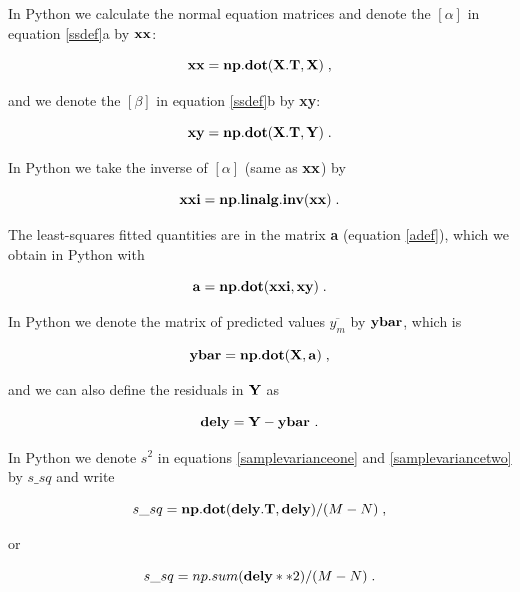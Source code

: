 \documentclass[psfig,preprint]{aastex}
\begin{document}
	In Python we calculate the normal equation matrices and denote the
$[\alpha]$ in equation \ref{ssdef}a by ${\bf xx}$:

\begin{mathletters} \label{eqn24}
\begin{equation}
{\bf xx} = {\bf np.dot(X.T,X)} \; ,
\end{equation}

\noindent and we denote the $[\beta]$ in equation \ref{ssdef}b by {\bf
xy}:

\begin{equation}
{\bf xy} = {\bf np.dot(X.T, Y)} \; .
\end{equation}
\end{mathletters}

\noindent In Python we take the inverse of $[\alpha]$ (same as $\bf xx$) by

\begin{equation}
{\bf xxi} = {\bf np.linalg.inv(xx)} \; .
\end{equation}

	The least-squares fitted quantities are in the matrix {\bf a}
(equation \ref{adef}), which we obtain in Python with

\begin{equation}
{\bf a} = {\bf np.dot(xxi, xy)} \; .
\end{equation}

	In Python we denote the matrix of predicted values $\overline{
y_m}$ by ${\bf ybar}$, which is 

\begin{equation}
\label{bteqn}
{\bf ybar} = {\bf np.dot(X,a)} \; ,
\end{equation}

\noindent and we can also define the residuals in $\bf Y$ as

\begin{equation}
{\bf dely} = {\bf Y - ybar} \ .
\end{equation}

\noindent In Python we denote $s^2$ in equations \ref{samplevarianceone}
and \ref{samplevariancetwo} by $s\_sq$ and write 

\begin{mathletters}
\label{sigsq}
\begin{equation}
s\_sq = {\bf np.dot(dely.T, dely)}/(M-N) \; ,
\end{equation}

\noindent or

\begin{equation}
s\_sq = np.sum({ \bf dely}**2)/(M-N) \; . 
\end{equation}
\end{mathletters}
\end{document}
